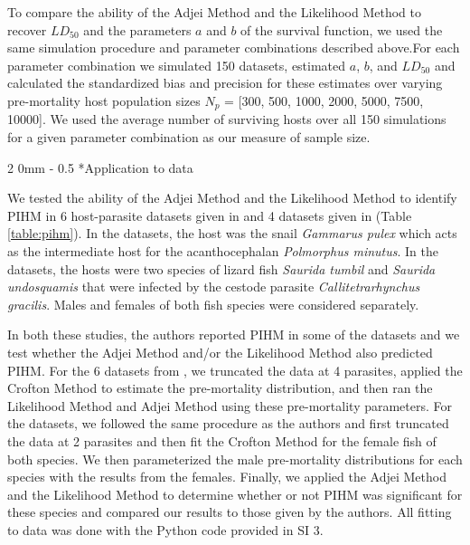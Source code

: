 \documentclass[12pt, a4paper]{article}
\makeatletter
\renewcommand{\subsection}{\@startsection
{subsection}%
{2}%
{0mm}%
{-\baselineskip}%
{0.5\baselineskip}%
{\normalfont\bf}} %
\makeatother
\begin{document}
To compare the ability of the Adjei Method and the Likelihood Method to recover $LD_{50}$ and the parameters $a$ and $b$ of the survival function, we used the same simulation procedure and parameter combinations described above.For each parameter
combination we simulated 150 datasets, estimated $a$, $b$, and $LD_{50}$ and calculated the standardized bias and
precision \citep{Walther2005} for these estimates over varying pre-mortality host population sizes  $N_p$ = [300, 500, 1000, 2000, 5000, 7500,
10000]. We used the average number of surviving hosts over all 150 simulations for a given parameter combination as our measure of sample size.

\subsection*{Application to data}

We tested the ability of the Adjei Method and the Likelihood Method to identify
PIHM in 6 host-parasite datasets given in \cite{Crofton1971a} and 4 datasets
given in \cite{Adjei1986} (Table \ref{table:pihm}). In the \cite{Crofton1971a} datasets, the host was
the snail \emph{Gammarus pulex} which acts as the intermediate host for the
acanthocephalan \emph{Polmorphus minutus}. In the \cite{Adjei1986} datasets,
the hosts were two species of lizard fish \emph{Saurida tumbil} and
\emph{Saurida undosquamis} that were infected by the cestode parasite
\emph{Callitetrarhynchus gracilis}.  Males and females of both fish species
were considered separately.

In both these studies, the authors reported PIHM in some of the datasets and we test whether the Adjei
Method and/or the Likelihood Method also predicted PIHM. For the 6 datasets from
\cite{Crofton1971a}, we truncated the data at 4 parasites, applied the Crofton
Method to estimate the pre-mortality distribution, and then ran the Likelihood
Method and Adjei Method using these pre-mortality parameters.  For the
\cite{Adjei1986} datasets, we followed the same procedure as the authors and
first truncated the data at 2 parasites and then fit the Crofton Method for the
female fish of both species.  We then parameterized the male pre-mortality
distributions for each species with the results from the females.  Finally, we
applied the Adjei Method and the Likelihood Method to determine whether or not
PIHM was significant for these species and compared our results to those given by the authors.  All fitting to data was done with the Python code provided in SI 3.
\end{document}
